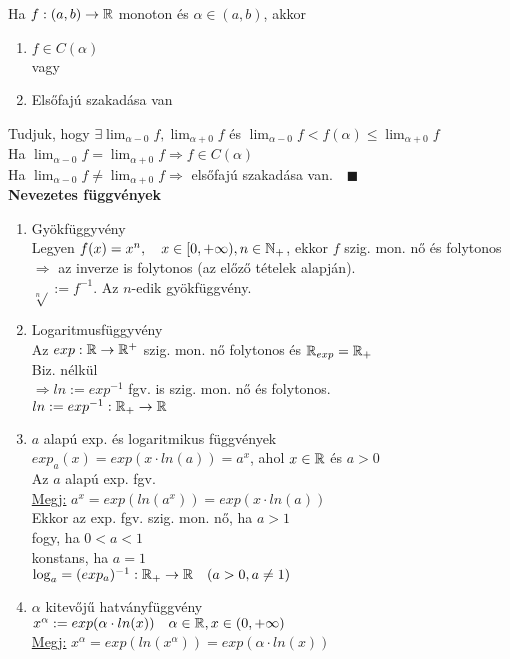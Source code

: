 \documentclass[a4paper,11pt]{article}
\begin{document}
\tetel Ha $f:(a,b)\to\mathbb{R}$ monoton és $\alpha\in(a,b)$, akkor
\begin{enumerate}
	\item $f\in C(\alpha)$\\[0.3cm] \hspace*{0.1cm} vagy
	\item Elsőfajú szakadása van
\end{enumerate}
\biz Tudjuk, hogy $\exists\displaystyle\lim_{\alpha-0} f,
\displaystyle\lim_{\alpha+0} f$ és $\displaystyle\lim_{\alpha-0} f < f(\alpha)\leq
\displaystyle\lim_{\alpha+0} f$\\[0.1cm] Ha $\displaystyle\lim_{\alpha-0} f=
\displaystyle\lim_{\alpha+0} f\Rightarrow f\in C(\alpha)$\\[0.1cm] Ha
$\displaystyle\lim_{\alpha-0} f\neq\displaystyle\lim_{\alpha+0} f\Rightarrow$
elsőfajú szakadása van.$\quad\blacksquare$\\[0.3cm]
\textbf{{\Large Nevezetes függvények}}
\begin{enumerate}
	\item Gyökfüggyvény \\ Legyen $f(x)=x^n,\quad x\in[0,+\infty), n\in\mathbb{N}_+$, ekkor
	$f$ szig. mon. nő és folytonos\\[0.1cm] $\Rightarrow$ az inverze is folytonos (az előző tételek alapján).\\[0.1cm]  $\sqrt[n]{} := f^{-1}$. Az $n$-edik
	gyökfüggvény.
	\item Logaritmusfüggyvény \\ \tetel Az $exp:\mathbb{R}\to\mathbb{R}^+$ szig. mon. nő folytonos
	és $\mathbb{R}_{exp}=\mathbb{R}_+$ \\[0.1cm] \biz Biz. nélkül\\[0.1cm]$\Rightarrow
	ln:=exp^{-1}$ fgv. is szig. mon. nő és folytonos.\\[0.1cm] 
	$ln:=exp^{-1}:\mathbb{R}_+\to\mathbb{R}$
	\item $a$ alapú exp. és logaritmikus függvények\\[0.1cm]
	$exp_a(x)=exp(x\cdot ln(a))=a^x$, ahol $x\in\mathbb{R}$ és $a>0$\\[0.1cm] Az $a$ alapú
	exp. fgv.\\[0.1cm]\hspace*{0.3cm} \underline{Megj:} $a^x=exp(ln(a^x))
	=exp(x\cdot ln(a))$ \\[0.1cm]Ekkor az exp. fgv. szig. mon. nő, ha
	$a>1$\\[0.1cm]\hspace*{4.6cm} fogy, ha $0<a<1$\\[0.1cm]\hspace*{3.9cm}
	konstans, ha $a=1$\\[0.1cm]  $\log_a=(exp_a)^{-1}:
	\mathbb{R}_+\to\mathbb{R}\quad(a>0,a\neq1)$
	\item $\alpha$ kitevőjű hatványfüggvény\\[0.1cm]
	$x^{\alpha}:=exp(\alpha\cdot ln(x))\quad\alpha\in\mathbb{R},x\in(0,+\infty)$
	\\[0.1cm]\hspace*{0.3cm} \underline{Megj:} $x^\alpha=exp(ln(x^\alpha))=
	exp(\alpha\cdot ln(x))$
\end{enumerate}
\end{document}
